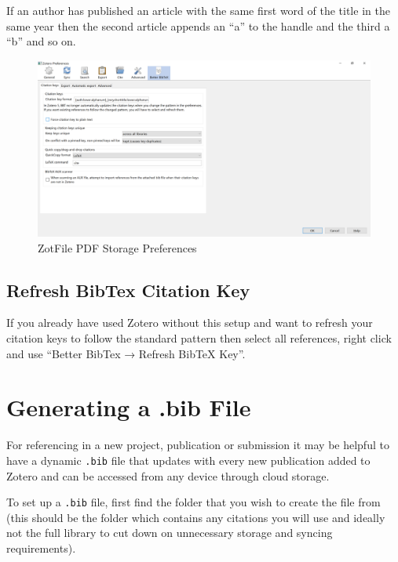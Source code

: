 \documentclass[
]{book}
\begin{document}
If an author has published an article with the same first word of the title in the same year then the second article appends an ``a'' to the handle and the third a ``b'' and so on.

\begin{figure}
\includegraphics[width=44.42in]{img/zotero_citation_key} \caption{ZotFile PDF Storage Preferences}\label{fig:zotfile-citation-key}
\end{figure}

\hypertarget{refresh-bibtex-citation-key}{%
\subsection{Refresh BibTex Citation Key}\label{refresh-bibtex-citation-key}}

If you already have used Zotero without this setup and want to refresh your citation keys to follow the standard pattern then select all references, right click and use ``Better BibTex → Refresh BibTeX Key''.

\hypertarget{generating-a-.bib-file}{%
\section{Generating a .bib File}\label{generating-a-.bib-file}}

For referencing in a new project, publication or submission it may be helpful to have a dynamic \texttt{.bib} file that updates with every new publication added to Zotero and can be accessed from any device through cloud storage.

To set up a \texttt{.bib} file, first find the folder that you wish to create the file from (this should be the folder which contains any citations you will use and ideally not the full library to cut down on unnecessary storage and syncing requirements).
\end{document}
